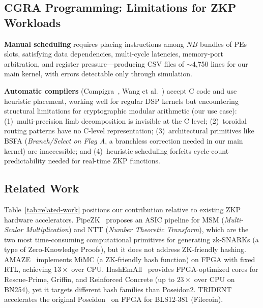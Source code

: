 \subsection{CGRA Programming: Limitations for ZKP Workloads}
\label{subsec:cgra-programming}

\textbf{Manual scheduling} requires placing instructions among $NB$ bundles of PEs slots,
satisfying data dependencies, multi-cycle latencies, memory-port arbitration, and register pressure---producing CSV files of $\sim$4{,}750 lines for our main kernel, with errors detectable only through simulation.

\noindent \textbf{Automatic compilers} (Compigra~\cite{compigra}, Wang et al.~\cite{wang2025mlir}) accept C code and use heuristic placement, working well for regular DSP kernels but encountering structural limitations for cryptographic modular arithmetic (our use case): (1)~multi-precision limb decomposition is invisible at the C level; (2)~toroidal routing patterns have no C-level representation; (3)~architectural primitives like BSFA (\textit{Branch/Select on Flag A}, a branchless correction needed in our main kernel) are inaccessible; and (4)~heuristic scheduling forfeits cycle-count predictability needed for real-time ZKP functions.


\subsection{Related Work}
\label{subsec:related-hw}

Table~\ref{tab:related-work} positions our contribution relative to existing ZKP hardware accelerators.
PipeZK~\cite{pipezk} proposes an ASIC pipeline for MSM (\textit{Multi-Scalar Multiplication}) and NTT (\textit{Number Theoretic Transform}), which
are the two most time-consuming computational primitives for generating zk-SNARKs (a type of Zero-Knowledge Proofs), but it does not address ZK-friendly hashing. AMAZE~\cite{amaze} implements MiMC (a ZK-friendly hash function) on FPGA with fixed RTL, achieving $13\times$ over CPU. HashEmAll~\cite{hashemall} provides FPGA-optimized cores for Rescue-Prime, Griffin, and Reinforced Concrete (up to $23\times$ over CPU on BN254), yet it targets different hash families than Poseidon2. TRIDENT~\cite{trident} accelerates the original Poseidon~\cite{poseidon} on FPGA for BLS12-381 (Filecoin).

